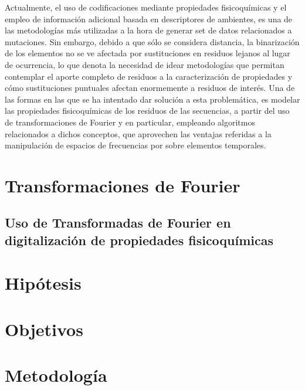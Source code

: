 Actualmente, el uso de codificaciones mediante propiedades fisicoquímicas y el empleo de información adicional basada en descriptores de ambientes, es una de las metodologías más utilizadas a la hora de generar set de datos relacionados a mutaciones. Sin embargo, debido a que sólo se considera distancia, la binarización de los elementos no se ve afectada por sustituciones en residuos lejanos al lugar de ocurrencia, lo que denota la necesidad de idear metodologías que permitan contemplar el aporte completo de residuos a la caracterización de propiedades y cómo sustituciones puntuales afectan enormemente a residuos de interés. Una de las formas en las que se ha intentado dar solución a esta problemática, es modelar las propiedades fisicoquímicas de los residuos de las secuencias, a partir del uso de transformaciones de Fourier y en particular, empleando algoritmos relacionados a dichos conceptos, que aprovechen las ventajas referidas a la manipulación de espacios de frecuencias por sobre elementos temporales.

\section{Transformaciones de Fourier}

\subsection{Uso de Transformadas de Fourier en digitalización de propiedades fisicoquímicas}

\section{Hipótesis}

\section{Objetivos}

\section{Metodología}


 